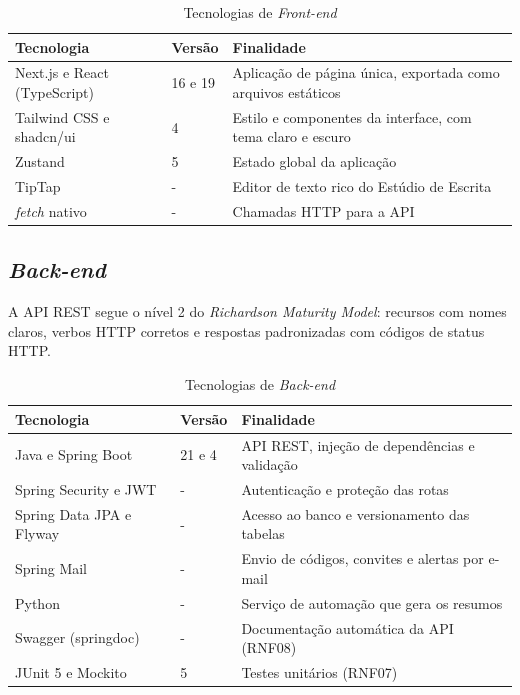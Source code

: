 \begin{table}[H]
\centering
\caption{Tecnologias de \textit{Front-end}}
\label{tab:frontend}
\begin{tabular}{|l|l|p{7cm}|}
\hline
\textbf{Tecnologia} & \textbf{Versão} & \textbf{Finalidade} \\
\hline
Next.js e React (TypeScript) & 16 e 19 & Aplicação de página única, exportada como arquivos estáticos \\
\hline
Tailwind CSS e shadcn/ui & 4 & Estilo e componentes da interface, com tema claro e escuro \\
\hline
Zustand & 5 & Estado global da aplicação \\
\hline
TipTap & - & Editor de texto rico do Estúdio de Escrita \\
\hline
\textit{fetch} nativo & - & Chamadas HTTP para a API \\
\hline
\end{tabular}
\end{table}

\subsection{\textit{Back-end}}

A API REST segue o nível 2 do \textit{Richardson Maturity Model}: recursos com nomes claros, verbos HTTP corretos e respostas padronizadas com códigos de status HTTP.

\begin{table}[H]
\centering
\caption{Tecnologias de \textit{Back-end}}
\label{tab:backend}
\begin{tabular}{|l|l|p{7cm}|}
\hline
\textbf{Tecnologia} & \textbf{Versão} & \textbf{Finalidade} \\
\hline
Java e Spring Boot & 21 e 4 & API REST, injeção de dependências e validação \\
\hline
Spring Security e JWT & - & Autenticação e proteção das rotas \\
\hline
Spring Data JPA e Flyway & - & Acesso ao banco e versionamento das tabelas \\
\hline
Spring Mail & - & Envio de códigos, convites e alertas por e-mail \\
\hline
Python & - & Serviço de automação que gera os resumos \\
\hline
Swagger (springdoc) & - & Documentação automática da API (RNF08) \\
\hline
JUnit 5 e Mockito & 5 & Testes unitários (RNF07) \\
\hline
\end{tabular}
\end{table}

